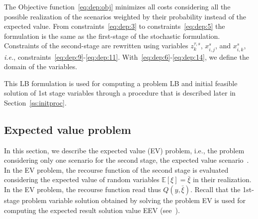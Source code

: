 \documentclass[a4paper,11pt]{article}
\begin{document}
	The Objective function~\eqref{eq:dep:obj} minimizes all costs considering all the possible realization of the scenarios weighted by their probability instead of the expected value. 
	From constraints~\eqref{eq:dep:3} to constraints~\eqref{eq:dep:5} the formulation is the same as the first-stage of the stochastic formulation.
	Constraints of the second-stage are rewritten using variables $z_k^{\tau,s}$, $ x_{i,j}^{s}$, and $ x_{i,k}^{s}$, \textit{i.e.}, constraints~\eqref{eq:dep:9}-\eqref{eq:dep:11}.
	With~\eqref{eq:dep:6}-\eqref{eq:dep:14}, we define the domain of the variables.

	This LB formulation is used for computing a problem LB and initial feasible solution of 1st stage variables through a procedure that is described later in Section~\ref{ss:initproc}.

	\subsection{Expected value problem}
	In this section, we describe the expected value (EV) problem, i.e., the problem considering only one scenario for the second stage, the expected value scenario~\cite{birge1982value}.
	In the EV problem, the recourse function of the second stage is evaluated considering the expected value of random variables $\mathbb{E}[\xi]= \bar{\xi}$ in their realization.
	In the EV problem, the recourse function read thus $Q \left(y,\bar{\xi}\right)$.
	Recall that the 1st-stage problem variable solution obtained by solving the problem EV is used for computing the expected result solution value EEV (see~\cite{birge1982value}).
	
\end{document}
